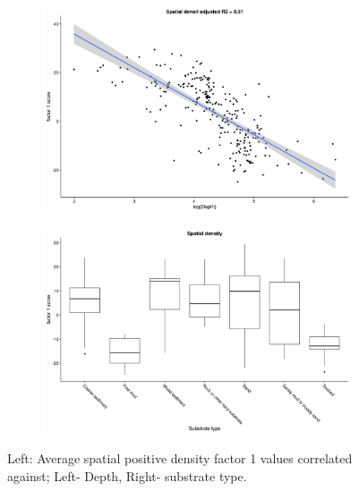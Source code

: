 \documentclass{article}
\begin{document}
\begin{figure}[!ht]
	\label{fig:S2}
	
\begin{subfigure}{0.5\textwidth}
	\includegraphics[width = \linewidth]{"figures/Factor1_DepthO2"}
\end{subfigure}
\begin{subfigure}{0.5\textwidth}
	\includegraphics[width = \linewidth]{"figures/Factor1_HabitatO2"}
\end{subfigure}
\caption{Left: Average spatial positive density factor 1 values correlated
	against; Left- Depth, Right- substrate type.}

\end{figure}
\end{document}
